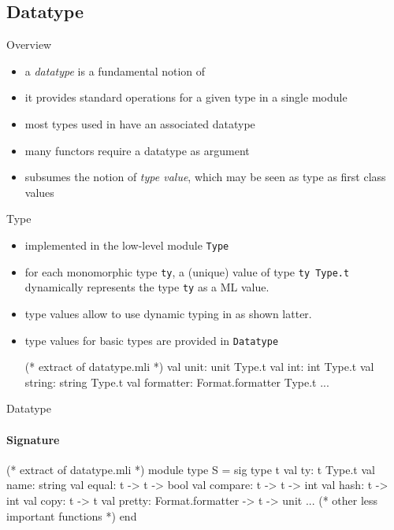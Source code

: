 \subsection{Datatype}

\begin{frame}{Overview}

  \begin{itemize}
  \item a \emph{datatype} is a fundamental notion of \framac
  \item it provides standard operations for a given type in a single module
  \item most types used in \framac have an associated datatype
  \item many \framac functors require a datatype as argument
  \item subsumes the \framac notion of \emph{type value}, which may be seen
    as type as first class values
  \end{itemize}

\end{frame}

\begin{frame}[fragile]{Type}
  \begin{itemize}
  \item implemented in the low-level module \lstinline+Type+
  \item for each monomorphic type \texttt{ty}, a (unique) value of type
    \lstinline+ty Type.t+ dynamically represents the type \texttt{ty} as a ML
    value. 
  \item type values allow to use dynamic typing in \framac as shown latter.
  \item type values for basic \ocaml types are provided in \lstinline+Datatype+
\begin{ocamlcode}
(* extract of datatype.mli *)
val unit: unit Type.t
val int: int Type.t
val string: string Type.t
val formatter: Format.formatter Type.t
...
\end{ocamlcode}
  \end{itemize}
\end{frame}

\begin{frame}[fragile]{Datatype}
  \framesubtitle{Signature}

\begin{ocamlcode}
(* extract of datatype.mli *)
module type S = sig
  type t
  val ty: t Type.t
  val name: string
  val equal: t -> t -> bool
  val compare: t -> t -> int
  val hash: t -> int
  val copy: t -> t  
  val pretty: Format.formatter -> t -> unit
  ... (* other less important functions *)
end
\end{ocamlcode}  
\end{frame}

